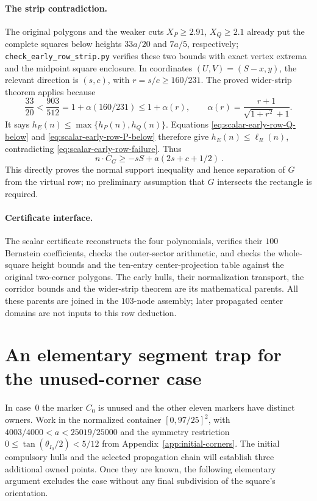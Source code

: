 \documentclass[11pt]{article}
\begin{document}
\paragraph{The strip contradiction.}
The original polygons and the weaker cuts $X_P\ge2.91$, $X_Q\ge2.1$
already put the complete squares below heights $33a/20$ and $7a/5$,
respectively; \texttt{check\_early\_row\_strip.py} verifies these
two bounds with exact vertex extrema and the midpoint square enclosure.
In coordinates $(U,V)=(S-x,y)$, the relevant direction is $(s,c)$,
with $r=s/c\ge160/231$. The proved wider-strip theorem applies because
\[
 \frac{33}{20}<\frac{903}{512}
 =1+\alpha(160/231)\le1+\alpha(r),\qquad
 \alpha(r)=\frac{r+1}{\sqrt{1+r^2}+1}.
\]
It says $h_E(n)\le\max\{h_P(n),h_Q(n)\}$.
Equations \eqref{eq:scalar-early-row-Q-below} and
\eqref{eq:scalar-early-row-P-below} therefore give
$h_E(n)\le\ell_R(n)$, contradicting
\eqref{eq:scalar-early-row-failure}. Thus
\[
 \boxed{\ n\cdot C_G\ge-sS+a(2s+c+1/2)\ }.
\]
This directly proves the normal support inequality and hence separation
of $G$ from the virtual row; no preliminary assumption that $G$ intersects
the rectangle is required.


\paragraph{Certificate interface.}
The scalar certificate reconstructs the four polynomials, verifies their
$100$ Bernstein coefficients, checks the outer-sector arithmetic, and
checks the whole-square height bounds and the ten-entry center-projection
table against the original two-corner polygons. The early hulls, their
normalization transport, the corridor bounds and the wider-strip theorem
are its mathematical parents. All these parents are joined in the
$103$-node assembly; later propagated center domains are not inputs to
this row deduction.

\section{An elementary segment trap for the unused-corner case}
\label{sec:case-zero-trap}
In case~0 the marker $C_0$ is unused and the other eleven markers have
distinct owners. Work in the normalized container $[0,97/25]^2$, with
$4003/4000<a<25019/25000$ and the symmetry restriction
$0\le\tan(\theta_{I_0}/2)<5/12$ from
Appendix~\ref{app:initial-corners}. The initial compulsory hulls and the
selected propagation chain will establish three additional owned points.
Once they are known, the following elementary argument excludes the case
without any final subdivision of the square's orientation.
\end{document}
